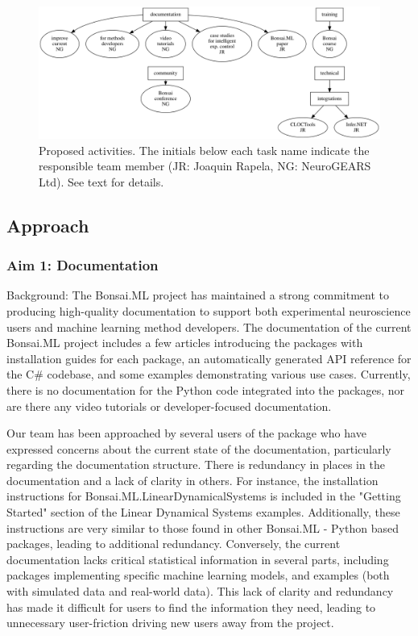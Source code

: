 
\begin{figure}
    \centering
    \includegraphics[width=6in]{activitiesGraphs/activities_larger.png}

    \caption{Proposed activities. The initials below each task name indicate
    the responsible team member (JR: Joaquin Rapela, NG: NeuroGEARS Ltd). See
    text for details.}

\end{figure}

\subsection{Approach}

\subsubsection{Aim 1: Documentation}

Background: The Bonsai.ML project has maintained a strong commitment to producing high-quality documentation to support both experimental neuroscience users and machine learning method developers. The documentation of the current Bonsai.ML project includes a few articles introducing the packages with installation guides for each package, an automatically generated API reference for the C\# codebase, and some examples demonstrating various use cases. Currently, there is no documentation for the Python code integrated into the packages, nor are there any video tutorials or developer-focused documentation.

Our team has been approached by several users of the package who have expressed concerns about the current state of the documentation, particularly regarding the documentation structure. There is redundancy in places in the documentation and a lack of clarity in others. For instance, the installation instructions for Bonsai.ML.LinearDynamicalSystems is included in the "Getting Started" section of the Linear Dynamical Systems examples. Additionally, these instructions are very similar to those found in other Bonsai.ML - Python based packages, leading to additional redundancy. Conversely, the current documentation lacks critical statistical information in several parts, including packages implementing specific machine learning models, and examples (both with simulated data and real-world data). This lack of clarity and redundancy has made it difficult for users to find the information they need, leading to unnecessary user-friction driving new users away from the project.


